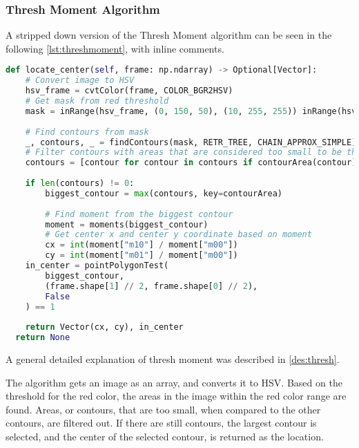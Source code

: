 \subsubsection{Thresh Moment Algorithm}\label{solution:thresh_moment}
A stripped down version of the Thresh Moment algorithm can be seen in the following \autoref{lst:threshmoment}, with inline comments.

\begin{lstlisting}[language=Python,label={lst:threshmoment},caption={Stripped down version of thresh moment from thresh\_moment.py}]
def locate_center(self, frame: np.ndarray) -> Optional[Vector]:
	# Convert image to HSV
	hsv_frame = cvtColor(frame, COLOR_BGR2HSV)
	# Get mask from red threshold
	mask = inRange(hsv_frame, (0, 150, 50), (10, 255, 255)) inRange(hsv_frame, (170, 150, 50), (180, 255, 255))
	
	# Find contours from mask
	_, contours, _ = findContours(mask, RETR_TREE, CHAIN_APPROX_SIMPLE)
	# Filter contours with areas that are considered too small to be the target
	contours = [contour for contour in contours if contourArea(contour) > 20]
	
	if len(contours) != 0:
		biggest_contour = max(contours, key=contourArea)
		
		# Find moment from the biggest contour
		moment = moments(biggest_contour)
		# Get center x and center y coordinate based on moment
		cx = int(moment["m10"] / moment["m00"])
		cy = int(moment["m01"] / moment["m00"])
    in_center = pointPolygonTest(
        biggest_contour,
        (frame.shape[1] // 2, frame.shape[0] // 2),
        False
    ) == 1
	
    return Vector(cx, cy), in_center
  return None
\end{lstlisting}

A general detailed explanation of thresh moment was described in \autoref{des:thresh}.

The algorithm gets an image as an array, and converts it to HSV.
Based on the threshold for the red color, the areas in the image within the red color range are found. 
Areas, or contours, that are too small, when compared to the other contours, are filtered out.
If there are still contours, the largest contour is selected, and the center of the selected contour, is returned as the location.